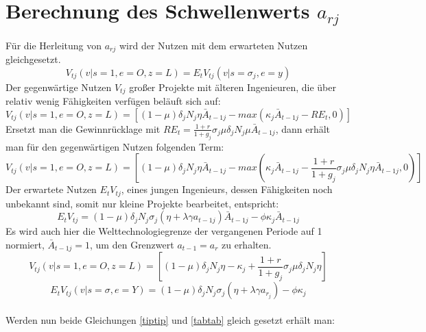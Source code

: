\section{Berechnung des Schwellenwerts $a_{rj}$}
Für die Herleitung von $a_{rj}$ wird der Nutzen mit dem erwarteten Nutzen gleichgesetzt.
\begin{equation}
V_{tj}(v| s=1, e=O, z=L) = E_{t}V_{tj}(v| s= \sigma_j, e=y)
\end{equation}
Der gegenwärtige Nutzen $V_{tj}$ gro{\ss}er Projekte mit älteren Ingenieuren, die über relativ wenig Fähigkeiten verfügen beläuft sich auf: 
\begin{equation}
V_{tj}(v|s=1, e=O, z=L) = \left [(1- \mu)\delta_{j} N_{j} \eta \bar{A}_{t-1j}- max (\kappa_{j} \bar{A}_{t-1j} -RE_{t}, 0) \right]
\end{equation}
Ersetzt man die Gewinnrücklage mit $RE_{t} =\frac{1+r}{1+g_{j}} \sigma_{j} \mu \delta_{j} N_{j} \mu \bar{A}_{t-1j}$, dann erhält man für den gegenwärtigen Nutzen folgenden Term:
\begin{equation}
V_{tj}(v| s=1, e=O, z=L) = \left [ (1- \mu) \delta_{j} N_{j} \eta \bar{A}_{t-1j}-max\left (\kappa_{j} \bar{A}_{t-1j}- \frac{1+r}{1+g_{j}}\sigma_{j} \mu \delta_{j}N_{j} \eta \bar{A}_{t-1j}, 0\right) \right ]
\end{equation}
Der erwartete Nutzen $E_{t}V_{tj}$, eines jungen Ingenieurs, dessen Fähigkeiten noch unbekannt sind, somit nur kleine Projekte bearbeitet, entspricht: 
\begin{equation}
E_{t}V_{tj}= (1- \mu) \delta_{j} N_{j} \sigma_{j}(\eta + \lambda \gamma a_{t-1j}) \bar{A}_{t-1j} - \phi \kappa_{j} \bar{A}_{t-1j}
\end{equation}
Es wird auch hier die Welttechnologiegrenze der vergangenen Periode auf 1 normiert, $\bar{A}_{t-1j} = 1$, um den Grenzwert $ a_{t-1} = a_r $ zu erhalten. 
\begin{equation}
V_{tj}(v| s=1, e=O, z=L) =\left [ (1- \mu) \delta_{j} N_{j} \eta - \kappa_{j} + \frac{1+r}{1+g_{j}} \sigma_{j} \mu \delta_{j} N_{j} \eta \right]\label{tiptip}
\end{equation}
\vspace{-0.4cm}
\begin{equation}
E_{t}V_{tj}(v| s=\sigma, e=Y) = (1- \mu) \delta_{j} N_{j} \sigma_{j} (\eta + \lambda \gamma a_{r_{j}}) - \phi \kappa_{j}\label{tabtab}
\end{equation}
\\
Werden nun beide Gleichungen \eqref{tiptip} und \eqref{tabtab} gleich gesetzt erhält man: 
